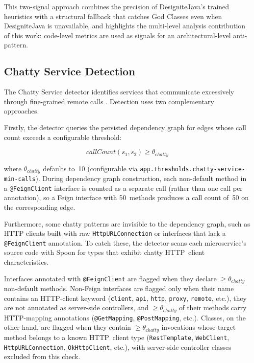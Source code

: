 This two-signal approach combines the precision of DesigniteJava's trained heuristics with a structural fallback that catches God Classes even when DesigniteJava is unavailable, and highlights the multi-level analysis contribution of this work: code-level metrics are used as signals for an architectural-level anti-pattern.

\subsection{Chatty Service Detection}
\label{subsec:detect-chatty-service}

\par The Chatty Service detector identifies services that communicate excessively through fine-grained remote calls \cite{Taibi2018, Richardson2018}. Detection uses two complementary approaches.

Firstly, the detector queries the persisted dependency graph for edges whose call count exceeds a configurable threshold:

\begin{equation}
    \mathit{callCount}(s_1, s_2) \geq \theta_{\mathit{chatty}}
    \label{eq:chatty-service-detection}
\end{equation}

\noindent where $\theta_{\mathit{chatty}}$ defaults to~10 (configurable via \texttt{app.\-thres\-holds.\-cha\-tty-ser\-vice\--min\--calls}). During dependency graph construction, each non-default method in a \texttt{@FeignClient} interface is counted as a separate call (rather than one call per annotation), so a Feign interface with 50~methods produces a call count of~50 on the corresponding edge.

Furthermore, some chatty patterns are invisible to the dependency graph, such as HTTP clients built with raw \texttt{HttpURLConnection} or interfaces that lack a \texttt{@Feign\-Client} annotation. To catch these, the detector scans each microservice's source code with Spoon for types that exhibit chatty HTTP~client characteristics.

Interfaces annotated with \texttt{@FeignClient} are flagged when they declare $\geq \theta_{\mathit{chatty}}$ non-default methods. Non-Feign interfaces are flagged only when their name contains an HTTP-client keyword (\texttt{client}, \texttt{api}, \texttt{http}, \texttt{proxy}, \texttt{remote}, etc.), they are not annotated as server-side controllers, and $\geq \theta_{\mathit{chatty}}$ of their methods carry HTTP-mapping annotations (\texttt{@GetMapping}, \texttt{@PostMapping}, etc.). Classes, on the other hand, are flagged when they contain $\geq \theta_{\mathit{chatty}}$ invocations whose target method belongs to a known HTTP~client type (\texttt{RestTemplate}, \texttt{WebClient}, \texttt{HttpURLConnection}, \texttt{OkHttpClient}, etc.), with server-side controller classes excluded from this check.

